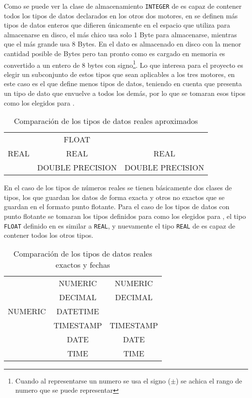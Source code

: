 Como se puede ver la clase de almacenamiento \verb=INTEGER= de \s es capaz de contener todos los tipos de datos declarados en los otros dos motores, en \m se definen más tipos de datos enteros que  difieren únicamente en el espacio que utiliza para almacenarse en disco, el más chico usa  solo 1 Byte para almacenarse, mientras que el más grande usa 8 Bytes. En \s el dato es almacenado en disco con la menor cantidad posible de Bytes pero tan pronto como es cargado en memoria es convertido a un entero de 8 bytes con signo\footnote{Cuando al representarse un numero se usa el signo ($\pm$) se achica el rango de numero que se puede representar}. Lo que  interesa para el proyecto es elegir un subconjunto de estos tipos que sean aplicables a los tres motores, en este caso es \p el que define menos tipos de datos, teniendo en cuenta que \s presenta un tipo de dato que envuelve a todos los demás, por lo que se tomaran esos tipos como los elegidos para \jj.
%
\begin{table}[h]
\begin{center}
\begin{tabular}{|c|c|c|}
\hline \s   & \m               & \p \\  
\hline      & FLOAT            &  \\ 
       REAL & REAL             & REAL \\
            & DOUBLE PRECISION & DOUBLE PRECISION \\
\hline 
\end{tabular} 
\end{center}
\caption{Comparación de los tipos de datos reales aproximados}
\end{table}
%

En el caso de los tipos de números reales se tienen básicamente dos clases de tipos, los que guardan los datos de forma exacta y otros no exactos que se guardan en el formato punto flotante. Para el caso de los tipos de datos con punto flotante se tomaran los tipos definidos para \p como los elegidos para \jj, el tipo \verb=FLOAT= definido en \m es similar a \verb=REAL=, y nuevamente el tipo \verb=REAL= de \s es capaz de contener todos los otros tipos. 
%
\begin{table}[h]
\begin{center}
\begin{tabular}{|c|c|c|}
\hline \s & \m & \p \\  
\hline  & NUMERIC & NUMERIC \\
  & DECIMAL & DECIMAL \\
NUMERIC  & DATETIME &  \\
  & TIMESTAMP & TIMESTAMP \\
  & DATE & DATE \\
  & TIME & TIME \\  
\hline 
\end{tabular} 
\end{center}
\caption{Comparación de los tipos de datos reales exactos y fechas}
\end{table}
%

